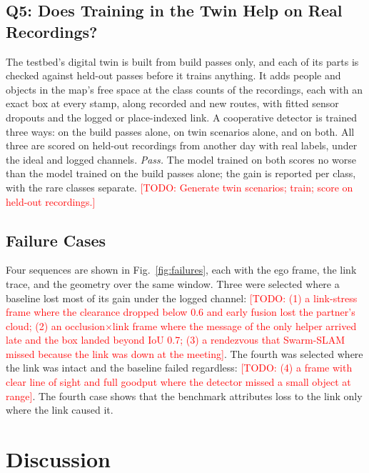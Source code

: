 \documentclass[journal]{IEEEtran}
\newcommand{\todo}[1]{\textcolor{red}{[TODO: #1]}}
\begin{document}


\subsection{Q5: Does Training in the Twin Help on Real Recordings?}
\label{sec:q5}
The testbed's digital twin \cite{scoop_testbed} is built from build
passes only, and each of its parts is checked against held-out passes
before it trains anything. It adds people and objects in the map's free
space at the class counts of the recordings, each with an exact box at
every stamp, along recorded and new routes, with fitted sensor dropouts
and the logged or place-indexed link. A cooperative detector is trained
three ways: on the build passes alone, on twin scenarios alone, and on
both. All three are scored on held-out recordings from another day with
real labels, under the ideal and logged channels. \emph{Pass.} The model
trained on both scores no worse than the model trained on the build
passes alone; the gain is reported per class, with the rare classes
separate. \todo{Generate twin scenarios; train; score on held-out
recordings.}

\subsection{Failure Cases}
\label{sec:failures}

Four sequences are shown in Fig.~\ref{fig:failures}, each with the
ego frame, the link trace, and the geometry over the same window.
Three were selected where a baseline lost most of its gain under the
logged channel: \todo{(1) a link-stress frame where the clearance
dropped below 0.6 and early fusion lost the partner's cloud; (2) an
occlusion$\times$link frame where the message of the only helper
arrived late and the box landed beyond IoU 0.7; (3) a rendezvous that
Swarm-SLAM missed because the link was down at the meeting}. The
fourth was selected where the link was intact and the baseline
failed regardless: \todo{(4) a frame with clear line of sight and
full goodput where the detector missed a small object at range}. The
fourth case shows that the benchmark attributes loss to the link only
where the link caused it.



\section{Discussion}
\label{sec:discussion}
\end{document}
